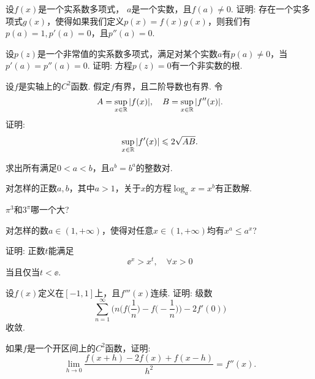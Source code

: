 \begin{example}
  设$f(x)$是一个实系数多项式， $a$是一个实数，且$f(a)\ne0$. 证明: 存在一个实多项式$g(x)$，使得如果我们定义$p(x)=f(x)g(x)$，则我们有$p(a)=1,p'(a)=0$，且$p''(a)=0$.
\end{example}

\begin{example}
  设$p(z)$是一个非常值的实系数多项式，满足对某个实数$a$有$p(a)\ne0$，当$p'(a)=p''(a)=0$. 证明: 方程$p(z)=0$有一个非实数的根.
\end{example}

\begin{example}
  设$f$是实轴上的$C^2$函数. 假定$f$有界，且二阶导数也有界. 令
  \[ A=\sup_{x\in\MR}|f(x)|,\quad B=\sup_{x\in\MR}|f''(x)|. \]
  证明:
  \[ \sup_{x\in\MR}|f'(x)|\le 2\sqrt{AB}. \]
\end{example}

\begin{example}
  求出所有满足$0<a<b$，且$a^b=b^a$的整数对.
\end{example}

\begin{example}
  对怎样的正数$a,b$，其中$a>1$，关于$x$的方程$\log_ax=x^b$有正数解.
\end{example}

\begin{example}
  $\pi^3$和$3^\pi$哪一个大?
\end{example}

\begin{example}
  对怎样的数$a\in(1,+\infty)$，使得对任意$x\in(1,+\infty)$均有$x^a\le a^x$?
\end{example}

\begin{example}
  证明: 正数$t$能满足
  \[ \ee^x>x^t,\quad \forall x>0 \]
  当且仅当$t<\ee$.
\end{example}

\begin{example}
  设$f(x)$定义在$[-1,1]$上，且$f'''(x)$连续. 证明: 级数
  \[
    \sum_{n=1}^{\infty}\bigg(
      n\Big( f\Big(\frac1n\Big)-f\Big(-\frac1n\Big) \Big)
      -2f'(0)
    \bigg)
  \]
  收敛.
\end{example}

\begin{example}
  如果$f$是一个开区间上的$C^2$函数，证明:
  \[
    \lim_{h\to0}\frac{f(x+h)-2f(x)+f(x-h)}{h^2}=f''(x).
  \]
\end{example}



